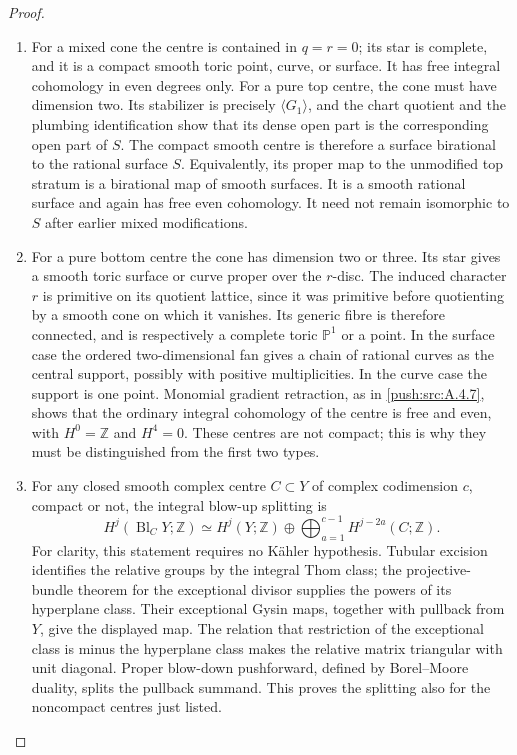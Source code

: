 \begin{proof}
\begin{enumerate}[label=\arabic*.,leftmargin=*]
\item For a mixed cone the centre is contained in $q=r=0$;
its star is complete, and it is a compact smooth toric
point, curve, or surface. It has free integral
cohomology in even degrees only. For a pure top centre,
the cone must have dimension two. Its stabilizer is
precisely $\langle G_1\rangle$, and the chart quotient
and the plumbing identification show that its dense
open part is the corresponding open part of $S$.
The compact smooth centre is therefore a surface
birational to the rational surface $S$. Equivalently,
its proper map to the unmodified top stratum is a
birational map of smooth surfaces. It is a smooth
rational surface and again has free even cohomology.
It need not remain isomorphic to $S$ after earlier
mixed modifications.

\item For a pure bottom centre the cone has dimension two
or three. Its star gives a smooth toric surface or
curve proper over the $r$-disc. The induced character
$r$ is primitive on its quotient lattice, since it
was primitive before quotienting by a smooth cone
on which it vanishes. Its generic fibre is therefore
connected, and is respectively a complete toric
$\mathbb P^1$ or a point. In the surface case the
ordered two-dimensional fan gives a chain of rational
curves as the central support, possibly with positive
multiplicities. In the curve case the support is one
point. Monomial gradient retraction, as in \ref{push:src:A.4.7},
shows that the ordinary integral cohomology of the
centre is free and even, with $H^0=\mathbb Z$ and
$H^4=0$. These centres are not compact; this is why
they must be distinguished from the first two types.

\item For any closed smooth complex centre $C\subset Y$ of
complex codimension $c$, compact or not, the integral
blow-up splitting is
\[
 H^j(\operatorname{Bl}_C Y;\mathbb Z)
 \simeq H^j(Y;\mathbb Z)\oplus
       \bigoplus_{a=1}^{c-1}H^{j-2a}(C;\mathbb Z).
\]
For clarity, this statement requires no K\"ahler
hypothesis. Tubular excision identifies the relative
groups by the integral Thom class; the projective-bundle
theorem for the exceptional divisor supplies the powers
of its hyperplane class. Their exceptional Gysin maps,
together with pullback from $Y$, give the displayed
map. The relation that restriction of the exceptional
class is minus the hyperplane class makes the relative
matrix triangular with unit diagonal. Proper
blow-down pushforward, defined by Borel--Moore duality,
splits the pullback summand. This proves the splitting
also for the noncompact centres just listed.


\end{enumerate}
\end{proof}

